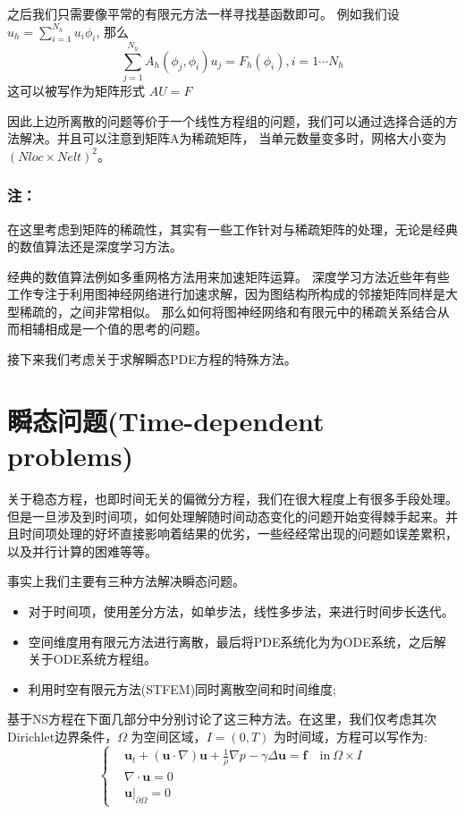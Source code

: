 之后我们只需要像平常的有限元方法一样寻找基函数即可。
例如我们设$u_h=\sum_{i=1}^{N_h}u_i\phi_i$, 那么 
$$\sum_{j=1}^{N_h}A_h(\phi_j,\phi_i)u_j=F_h(\phi_i),i=1\cdots N_h$$
这可以被写作为矩阵形式 $AU=F$

因此上边所离散的问题等价于一个线性方程组的问题，我们可以通过选择合适的方法解决。并且可以注意到矩阵A为稀疏矩阵，
当单元数量变多时，网格大小变为$(Nloc\times Nelt)^2$。

\subsubsection*{\textbf{注：}}
    在这里考虑到矩阵的稀疏性，其实有一些工作针对与稀疏矩阵的处理，无论是经典的数值算法还是深度学习方法。

    经典的数值算法例如多重网格方法用来加速矩阵运算。
    深度学习方法近些年有些工作专注于利用图神经网络进行加速求解，因为图结构所构成的邻接矩阵同样是大型稀疏的，之间非常相似。
    那么如何将图神经网络和有限元中的稀疏关系结合从而相辅相成是一个值的思考的问题。

接下来我们考虑关于求解瞬态PDE方程的特殊方法。
\section{瞬态问题(Time-dependent problems)}
关于稳态方程，也即时间无关的偏微分方程，我们在很大程度上有很多手段处理。但是一旦涉及到时间项，如何处理解随时间动态变化的问题开始变得棘手起来。并且时间项处理的好坏直接影响着结果的优劣，一些经经常出现的问题如误差累积，以及并行计算的困难等等。

事实上我们主要有三种方法解决瞬态问题。
\begin{itemize}
    \item 对于时间项，使用差分方法，如单步法，线性多步法，来进行时间步长迭代。
    \item 空间维度用有限元方法进行离散，最后将PDE系统化为为ODE系统，之后解关于ODE系统方程组。
    \item 利用时空有限元方法(STFEM)同时离散空间和时间维度;
\end{itemize}

基于NS方程在下面几部分中分别讨论了这三种方法。在这里，我们仅考虑其次Dirichlet边界条件，$\Omega$ 为空间区域，$I=(0,T)$ 为时间域，方程可以写作为:
$$\left\{
    \begin{aligned}
        &\textbf{u}_t+(\textbf{u}\cdot \nabla)\textbf{u}+\frac{1}{\rho}\nabla p-\gamma \Delta \textbf{u}=\textbf{f}\quad \text{in} \ \Omega\times I\\
        &\nabla \cdot \textbf{u}=0\\
        &\textbf{u}|_{\partial \Omega}=0
    \end{aligned}
\right.$$

